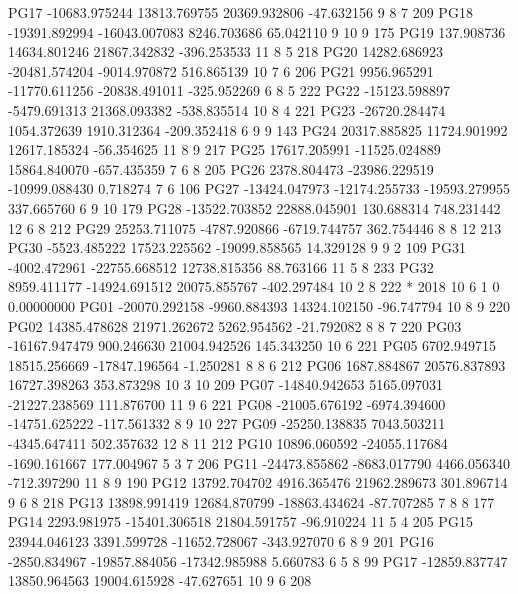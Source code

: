 PG17 -10683.975244  13813.769755  20369.932806    -47.632156  9  8  7 209       
PG18 -19391.892994 -16043.007083   8246.703686     65.042110  9 10  9 175       
PG19    137.908736  14634.801246  21867.342832   -396.253533 11  8  5 218       
PG20  14282.686923 -20481.574204  -9014.970872    516.865139 10  7  6 206       
PG21   9956.965291 -11770.611256 -20838.491011   -325.952269  6  8  5 222       
PG22 -15123.598897  -5479.691313  21368.093382   -538.835514 10  8  4 221       
PG23 -26720.284474   1054.372639   1910.312364   -209.352418  6  9  9 143       
PG24  20317.885825  11724.901992  12617.185324    -56.354625 11  8  9 217       
PG25  17617.205991 -11525.024889  15864.840070   -657.435359  7  6  8 205       
PG26   2378.804473 -23986.229519 -10999.088430      0.718274  7     6 106       
PG27 -13424.047973 -12174.255733 -19593.279955    337.665760  6  9 10 179       
PG28 -13522.703852  22888.045901    130.688314    748.231442 12  6  8 212       
PG29  25253.711075  -4787.920866  -6719.744757    362.754446  8  8 12 213       
PG30  -5523.485222  17523.225562 -19099.858565     14.329128  9  9  2 109       
PG31  -4002.472961 -22755.668512  12738.815356     88.763166 11  5  8 233       
PG32   8959.411177 -14924.691512  20075.855767   -402.297484 10  2  8 222       
*  2018 10  6  1  0  0.00000000
PG01 -20070.292158  -9960.884393  14324.102150    -96.747794 10  8  9 220       
PG02  14385.478628  21971.262672   5262.954562    -21.792082  8  8  7 220       
PG03 -16167.947479    900.246630  21004.942526    145.343250 10  6    221       
PG05   6702.949715  18515.256669 -17847.196564     -1.250281  8  8  6 212       
PG06   1687.884867  20576.837893  16727.398263    353.873298 10  3 10 209       
PG07 -14840.942653   5165.097031 -21227.238569    111.876700 11  9  6 221       
PG08 -21005.676192  -6974.394600 -14751.625222   -117.561332  8  9 10 227       
PG09 -25250.138835   7043.503211  -4345.647411    502.357632 12  8 11 212       
PG10  10896.060592 -24055.117684  -1690.161667    177.004967  5  3  7 206       
PG11 -24473.855862  -8683.017790   4466.056340   -712.397290 11  8  9 190       
PG12  13792.704702   4916.365476  21962.289673    301.896714  9  6  8 218       
PG13  13898.991419  12684.870799 -18863.434624    -87.707285  7  8  8 177       
PG14   2293.981975 -15401.306518  21804.591757    -96.910224 11  5  4 205       
PG15  23944.046123   3391.599728 -11652.728067   -343.927070  6  8  9 201       
PG16  -2850.834967 -19857.884056 -17342.985988      5.660783  6  5  8  99       
PG17 -12859.837747  13850.964563  19004.615928    -47.627651 10  9  6 208       
